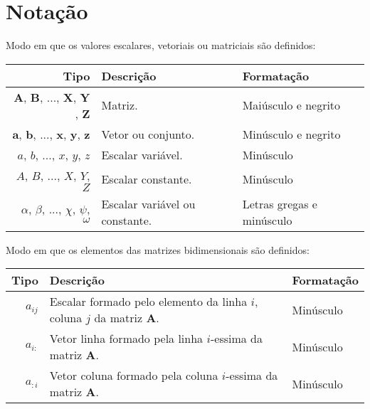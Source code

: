 
\chapter{Notação}


\begin{notation}Modo em que os valores escalares, vetoriais ou matriciais são definidos:\\
\begin{tabular}{r | p{.4\linewidth} | l}
\hline	
Tipo & Descrição & Formatação \\ \hline
$\mathbf{A}$, $\mathbf{B}$, ..., $\mathbf{X}$, $\mathbf{Y}$, $\mathbf{Z}$& Matriz. & Maiúsculo e negrito \\
$\mathbf{a}$, $\mathbf{b}$, ..., $\mathbf{x}$, $\mathbf{y}$, $\mathbf{z}$ & Vetor ou conjunto. & Minúsculo e negrito \\
$a$, $b$, ..., $x$, $y$, $z$ & Escalar variável. & Minúsculo \\
$A$, $B$, ..., $X$, $Y$, $Z$ & Escalar constante. & Minúsculo \\
$\alpha$, $\beta$, ..., $\chi$, $\psi$, $\omega$ & Escalar variável ou constante. & Letras gregas e minúsculo  \\ \hline
\end{tabular}
\end{notation}

\begin{notation}Modo em que os elementos das matrizes bidimensionais são definidos:\\
\begin{tabular}{r | p{.6\linewidth} | l}
\hline	
Tipo & Descrição & Formatação \\ \hline
$a_{ij}$ & Escalar formado pelo elemento da linha $i$, coluna $j$ da matriz $\mathbf{A}$. & Minúsculo \\ \hline
$a_{i:}$ & Vetor linha formado pela linha $i$-essima da matriz $\mathbf{A}$.  & Minúsculo \\
$a_{:i}$ & Vetor coluna formado pela coluna $i$-essima da matriz $\mathbf{A}$.  & Minúsculo \\
\end{tabular}
\end{notation}


